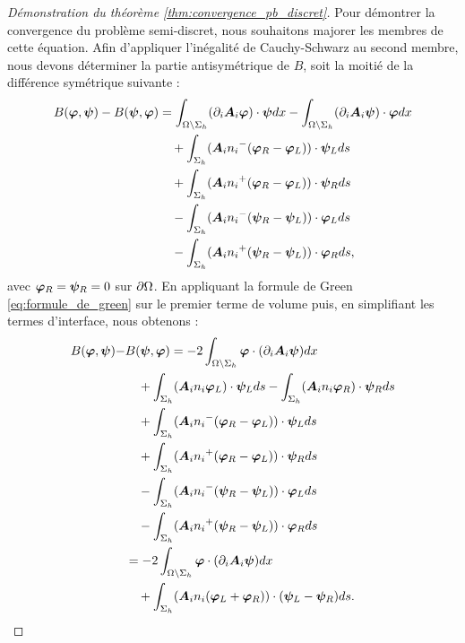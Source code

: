 \begin{proof}[Démonstration du théorème \ref{thm:convergence_pb_discret}]
	Pour démontrer la convergence du problème semi-discret, nous souhaitons majorer
	les membres de cette équation. Afin d'appliquer l'inégalité de Cauchy-Schwarz
	au second membre, nous devons déterminer la partie antisymétrique de $B$,
	soit la moitié de la différence symétrique suivante :
	\begin{equation}
		\begin{aligned}
			B(\bm{\varphi},\bm{\psi}) - B(\bm{\psi},\bm{\varphi}) &=
			\int_{\Omega \setminus \Sigma_h}
				(\partial_{i} \bm{A}_{i} \bm{\varphi}) \cdot \bm{\psi} dx
			- \int_{\Omega \setminus \Sigma_h}
				(\partial_{i} \bm{A}_{i} \bm{\psi}) \cdot \bm{\varphi} dx \\
			&\quad + \int_{\Sigma_h}
				({\bm{A}_{i}n_{i}}^{-} (\bm{\varphi}_R - \bm{\varphi}_L)) \cdot \bm{\psi}_L ds \\
			&\quad + \int_{\Sigma_h}
				({\bm{A}_{i}n_{i}}^{+} (\bm{\varphi}_R - \bm{\varphi}_L)) \cdot \bm{\psi}_R ds \\
			&\quad - \int_{\Sigma_h}
				({\bm{A}_{i}n_{i}}^{-} (\bm{\psi}_R - \bm{\psi}_L)) \cdot \bm{\varphi}_L ds \\
			&\quad - \int_{\Sigma_h}
				({\bm{A}_{i}n_{i}}^{+} (\bm{\psi}_R - \bm{\psi}_L)) \cdot \bm{\varphi}_R ds ,
		\end{aligned}
	\end{equation}
	avec $\bm{\varphi}_R = \bm{\psi}_R = 0$ sur $\partial\Omega$.
	En appliquant la formule de Green \eqref{eq:formule_de_green}
	sur le premier terme de volume puis,
	en simplifiant les termes d'interface, nous obtenons :
	\begin{equation}
		\begin{aligned}
			B(\Bphi,\Bpsi) - &B(\Bpsi,\Bphi) =
			- 2 \int_{\PbEsp \setminus \UItf_h}
				\Bphi \cdot (\Ptl{i} \Ai \Bpsi) dx \\
			&\quad + \int_{\UItf_h} (\Aini \Bphi_\L) \cdot \Bpsi_\L ds
				- \int_{\UItf_h} (\Aini \Bphi_\R) \cdot \Bpsi_\R ds \\
			&\quad + \int_{\UItf_h}
				(\Neg{\Aini} (\Bphi_\R - \Bphi_\L)) \cdot \Bpsi_\L ds \\
			&\quad + \int_{\UItf_h}
				(\Pos{\Aini} (\Bphi_\R - \Bphi_\L)) \cdot \Bpsi_\R ds \\
			&\quad - \int_{\UItf_h}
				(\Neg{\Aini} (\Bpsi_\R - \Bpsi_\L)) \cdot \Bphi_\L ds \\
			&\quad - \int_{\UItf_h}
				(\Pos{\Aini} (\Bpsi_\R - \Bpsi_\L)) \cdot \Bphi_\R ds \\
			&= - 2 \int_{\PbEsp \setminus \UItf_h}
				\Bphi \cdot (\Ptl{i} \Ai \Bpsi) dx \\
			&\quad + \int_{\UItf_h}
				(\Aini (\Bphi_\L + \Bphi_\R))
				\cdot (\Bpsi_\L - \Bpsi_\R) ds .

\end{aligned}
\end{equation}
\end{proof}
